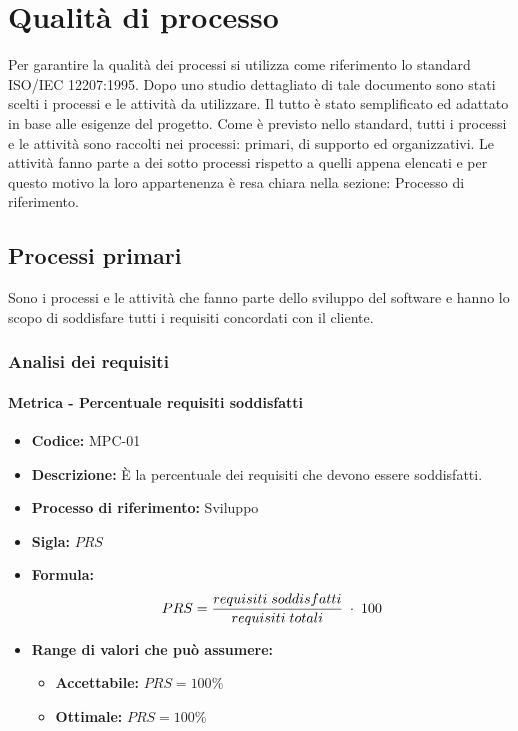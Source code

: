 \section{Qualità di processo}
Per garantire la qualità dei processi si utilizza come riferimento lo standard ISO/IEC 12207:1995. Dopo uno studio dettagliato di tale documento sono stati scelti i processi
e le attività da utilizzare. Il tutto è stato semplificato ed adattato in base alle esigenze del progetto. Come è previsto nello standard, tutti i processi e le attività sono raccolti 
nei processi: primari, di supporto ed organizzativi. Le attività fanno parte a dei sotto processi rispetto a quelli appena elencati e per questo motivo la loro 
appartenenza è resa chiara nella sezione: Processo di riferimento.

\subsection{Processi primari}
Sono i processi e le attività che fanno parte dello sviluppo del software e hanno lo scopo di soddisfare tutti i requisiti concordati con il cliente.

\subsubsection{Analisi dei requisiti}
    \paragraph{Metrica - Percentuale requisiti soddisfatti}
    \begin{itemize}
        \item \textbf{Codice:} MPC-01
        \item \textbf{Descrizione:} È la percentuale dei requisiti che devono essere soddisfatti.
        \item \textbf{Processo di riferimento:} Sviluppo
        \item \textbf{Sigla:} $PRS$
        \item \textbf{Formula:} $$PRS = {requisiti \; soddisfatti \over requisiti \; totali}\; \cdot \; 100$$
        \item \textbf{Range di valori che può assumere:}
        \begin{itemize}
            \item \textbf{Accettabile:} $PRS = 100\%$
            \item \textbf{Ottimale:} $PRS = 100\%$
        \end{itemize}
    \end{itemize}

